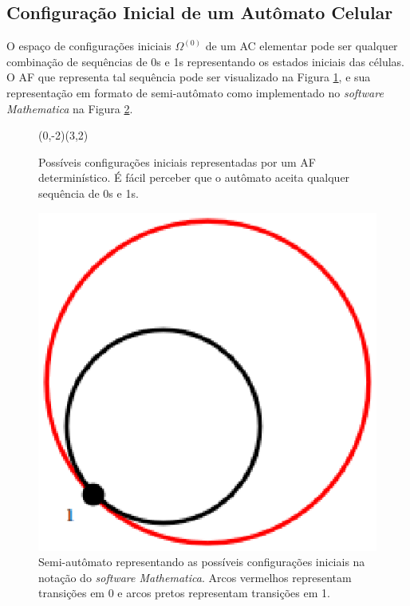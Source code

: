 \documentclass[12pt,a4paper]{article}
\begin{document}
\subsection{Configuração Inicial de um Autômato Celular}

O espaço de configurações iniciais $\Omega^{(0)}$ de um AC
elementar pode ser qualquer combinação de sequências de 0s e 1s
representando os estados iniciais das células. O AF
que representa tal sequência pode ser visualizado na Figura
\ref{fig:initconfigautomaton}, e sua representação em formato de
semi-autômato como implementado no \textit{software Mathematica}
na Figura \ref{fig:initconfigmathematica}.

\begin{figure}[htp]
\begin{center}
\begin{VCPicture}{(0,-2)(3,2)}
\end{VCPicture}
\caption{Possíveis configurações iniciais representadas por um AF
determinístico. É fácil perceber que o autômato aceita qualquer sequência de
0s e 1s.}
\label{fig:initconfigautomaton}
\end{center}
\end{figure}

\begin{figure}[htp]
\begin{center}
\includegraphics[scale=0.3]{img/InitialConfig.eps}
\caption{Semi-autômato representando as possíveis configurações iniciais
na notação do \textit{software Mathematica}. Arcos vermelhos representam
transições em 0 e arcos pretos representam transições em 1.}
\label{fig:initconfigmathematica}
\end{center}
\end{figure}
\end{document}
